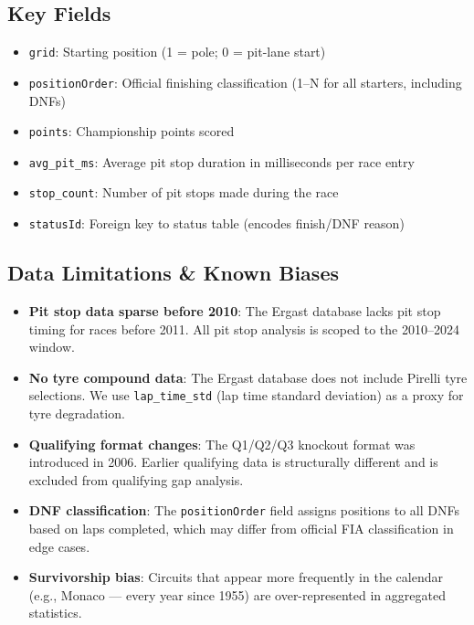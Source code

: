 \documentclass[12pt, a4paper]{article}
\begin{document}
\subsection{Key Fields}
\begin{itemize}
    \item \texttt{grid}: Starting position (1 = pole; 0 = pit-lane start)
    \item \texttt{positionOrder}: Official finishing classification (1--N for all starters, including DNFs)
    \item \texttt{points}: Championship points scored
    \item \texttt{avg\_pit\_ms}: Average pit stop duration in milliseconds per race entry
    \item \texttt{stop\_count}: Number of pit stops made during the race
    \item \texttt{statusId}: Foreign key to status table (encodes finish/DNF reason)
\end{itemize}

\subsection{Data Limitations \& Known Biases}
\begin{itemize}
    \item \textbf{Pit stop data sparse before 2010}: The Ergast database lacks pit stop timing for races before 2011. All pit stop analysis is scoped to the 2010--2024 window.
    \item \textbf{No tyre compound data}: The Ergast database does not include Pirelli tyre selections. We use \texttt{lap\_time\_std} (lap time standard deviation) as a proxy for tyre degradation.
    \item \textbf{Qualifying format changes}: The Q1/Q2/Q3 knockout format was introduced in 2006. Earlier qualifying data is structurally different and is excluded from qualifying gap analysis.
    \item \textbf{DNF classification}: The \texttt{positionOrder} field assigns positions to all DNFs based on laps completed, which may differ from official FIA classification in edge cases.
    \item \textbf{Survivorship bias}: Circuits that appear more frequently in the calendar (e.g., Monaco --- every year since 1955) are over-represented in aggregated statistics.
\end{itemize}

\newpage
\end{document}
